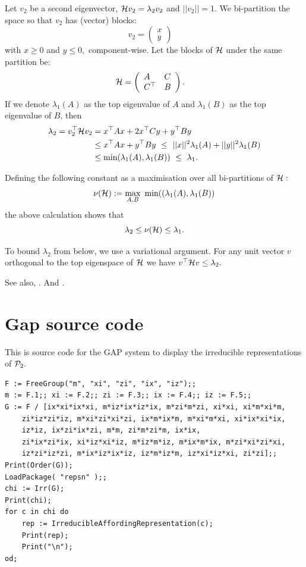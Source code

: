 \documentclass[12pt,notitlepage,longbibliography,nofootinbib,tightenlines]{revtex4}
\begin{document}
Let $v_2$ be a second eigenvector, $ \mathcal{H} v_2 = \lambda_2 v_2 $ 
and $||v_2||=1$.
We bi-partition the space 
so that $v_2$ has (vector) blocks:
$$
v_2 = \left( \begin{array}{l}
x\\
y\end{array} \right)\quad
$$
with $x\ge 0$ and $y\le 0,$ component-wise.
Let the blocks of $\mathcal{H}$ under the same partition be:
$$
\mathcal{H} = \left( \begin{array}{ll}
A&C\\
C^\top&B\end{array} \right).\quad
$$
If we denote $\lambda_1(A)$ as the top eigenvalue of $A$ and
$\lambda_1(B)$ as the top eigenvalue of $B$,
then
\begin{align*}
\lambda_2 = v_2^\top \mathcal{H} v_2 &= x^\top A x + 2 x^\top C y + y^\top B y \\
        &\le x^\top A x + y^\top B y\ \le\ ||x||^2 \lambda_1(A) + ||y||^2 \lambda_1(B) \\
        &\le \mbox{min}(\lambda_1(A), \lambda_1(B))\ \le\ \lambda_1.
\end{align*}

Defining the following constant as a maximisation over
all bi-partitions of $\mathcal{H}:$
$$
    \nu(\Ham) := \max_{A, B}\ \mbox{min}((\lambda_1(A), \lambda_1(B))
$$
the above calculation shows that
$$
    \lambda_2 \le \nu(\mathcal{H}) \le \lambda_1.
$$

To bound $\lambda_2$ from below, we use a variational argument.
For any unit vector $v$ orthogonal to the top eigenspace of $\mathcal{H}$ we
have $v^\top \mathcal{H} v \le \lambda_2.$


See also,
\cite{AlShimary2010}.
And \cite{Jarret2015}.

%


\appendix

\section{Gap source code}

This is source code for the GAP system \cite{GAP4} to display
the irreducible representations of $\mathcal{P}_2.$

\begin{verbatim}
F := FreeGroup("m", "xi", "zi", "ix", "iz");;
m := F.1;; xi := F.2;; zi := F.3;; ix := F.4;; iz := F.5;;
G := F / [ix*xi*ix*xi, m*iz*ix*iz*ix, m*zi*m*zi, xi*xi, xi*m*xi*m, 
    zi*iz*zi*iz, m*xi*zi*xi*zi, ix*m*ix*m, m*xi*m*xi, xi*ix*xi*ix, 
    iz*iz, ix*zi*ix*zi, m*m, zi*m*zi*m, ix*ix, 
    zi*ix*zi*ix, xi*iz*xi*iz, m*iz*m*iz, m*ix*m*ix, m*zi*xi*zi*xi, 
    iz*zi*iz*zi, m*ix*iz*ix*iz, iz*m*iz*m, iz*xi*iz*xi, zi*zi];;
Print(Order(G));
LoadPackage( "repsn" );;
chi := Irr(G);
Print(chi);
for c in chi do
    rep := IrreducibleAffordingRepresentation(c);
    Print(rep);
    Print("\n");
od;
\end{verbatim}


{}

\end{document}
